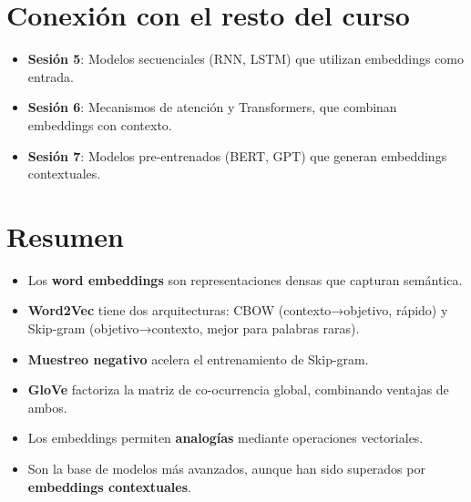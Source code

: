 \documentclass[12pt,a4paper,openany,oneside]{book}
\begin{document}
\section{Conexión con el resto del curso}
\begin{itemize}
    \item \textbf{Sesión 5}: Modelos secuenciales (RNN, LSTM) que utilizan embeddings como entrada.
    \item \textbf{Sesión 6}: Mecanismos de atención y Transformers, que combinan embeddings con contexto.
    \item \textbf{Sesión 7}: Modelos pre-entrenados (BERT, GPT) que generan embeddings contextuales.
\end{itemize}

\section{Resumen}
\begin{itemize}
    \item Los \textbf{word embeddings} son representaciones densas que capturan semántica.
    \item \textbf{Word2Vec} tiene dos arquitecturas: CBOW (contexto→objetivo, rápido) y Skip-gram (objetivo→contexto, mejor para palabras raras).
    \item \textbf{Muestreo negativo} acelera el entrenamiento de Skip-gram.
    \item \textbf{GloVe} factoriza la matriz de co-ocurrencia global, combinando ventajas de ambos.
    \item Los embeddings permiten \textbf{analogías} mediante operaciones vectoriales.
    \item Son la base de modelos más avanzados, aunque han sido superados por \textbf{embeddings contextuales}.
\end{itemize}
\end{document}
